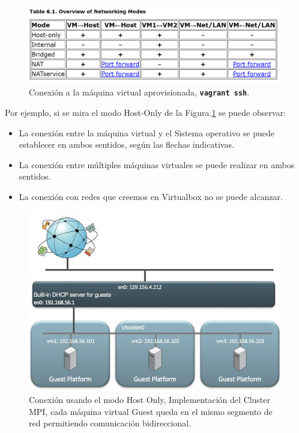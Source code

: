\documentclass[letterpaper, 12pt, oneside]{article}
\begin{document}
    \begin{figure}[H]
        \includegraphics[scale=0.8]{img/networking/networking3.png}
        \caption{Conexión a la máquina virtual aprovisionada, \textbf{\texttt{vagrant ssh}}.}
        \label{fig:net33}
    \end{figure}
    
    Por ejemplo, si se mira el modo Host-Only de la Figura.\ref{fig:net33} se puede observar: 
    \begin{itemize}
        \item La conexión entre la máquina virtual y el Sistema operativo se puede establecer en ambos sentidos, según las flechas indicativas. 
        \item La conexión entre múltiples máquinas virtuales se puede realizar en ambos sentidos.
        \item La conexión con redes que creemos en Virtualbox no se puede alcanzar.
    \end{itemize}
    
    \begin{center}
         \begin{figure}[H]
            \includegraphics[scale=1.4]{img/networking/host_only.jpg}
            \caption{Conexión usando el modo Host Only, Implementación del Cluster MPI, cada máquina virtual Guest queda en el mismo segmento de red permitiendo comunicación bidireccional.}
            \label{fig:net21}
        \end{figure}
    \end{center}
   
\end{document}
